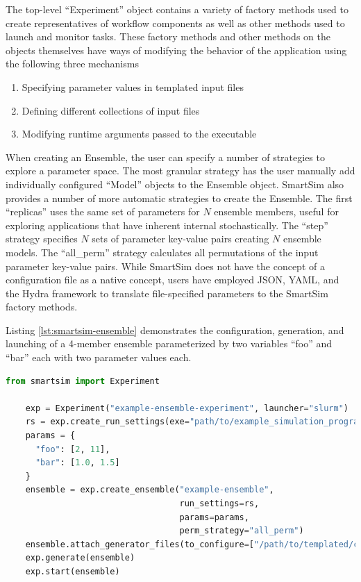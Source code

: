\documentclass[utf8]{FrontiersinVancouver} %
\begin{document}
The top-level ``Experiment'' object contains a variety of factory methods used to create representatives of workflow components as well as other methods used to launch and monitor tasks. These factory methods and other methods on the objects themselves have ways of modifying the behavior of the application using the following three mechanisms
\begin{enumerate}
    \item Specifying parameter values in templated input files
    \item Defining different collections of input files
    \item Modifying runtime arguments passed to the executable
\end{enumerate}
When creating an Ensemble, the user can specify a number of strategies to explore a parameter space. The most granular strategy has the user manually add individually configured ``Model'' objects to the Ensemble object. SmartSim also provides a number of more automatic strategies to create the Ensemble. The first ``replicas'' uses the same set of parameters for $N$ ensemble members, useful for exploring applications that have inherent internal stochastically. The ``step'' strategy specifies $N$ sets of parameter key-value pairs creating $N$ ensemble models. The ``all\_perm'' strategy calculates all permutations of the input parameter key-value pairs. While SmartSim does not have the concept of a configuration file as a native concept, users have employed JSON, YAML, and the Hydra framework \cite{Hadan2019Hydra} to translate file-specified parameters to the SmartSim factory methods.

Listing \ref{lst:smartsim-ensemble} demonstrates the configuration, generation, and launching of a 4-member ensemble parameterized by two variables ``foo'' and ``bar'' each with two parameter values each. 

\begin{lstlisting}[language=python,caption={Configuration of an ensemble in SmartSim},captionpos=b,label=lst:smartsim-ensemble]
    from smartsim import Experiment

    exp = Experiment("example-ensemble-experiment", launcher="slurm")
    rs = exp.create_run_settings(exe="path/to/example_simulation_program")
    params = {
      "foo": [2, 11],
      "bar": [1.0, 1.5]
    }
    ensemble = exp.create_ensemble("example-ensemble", 
                                   run_settings=rs, 
                                   params=params, 
                                   perm_strategy="all_perm")
    ensemble.attach_generator_files(to_configure=["/path/to/templated/config/file"])
    exp.generate(ensemble)
    exp.start(ensemble)
\end{lstlisting}
\end{document}
